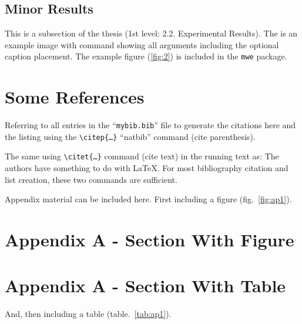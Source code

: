 \documentclass[ms-thesis,12pt,mathdesign]{ndsu-thesis-2022}
\begin{document}
\subsection{Minor Results}
This is a subsection of the thesis (1st level: 2.2. Experimental Results). 	\kant[8]
The  is an example image with command showing all arguments including the optional 
caption placement. The example figure (\cref{fig:2}) is included in the \texttt{mwe} package.

\kant[8]

\section{Some References}
Referring to all entries in the ``\texttt{mybib.bib}'' file to generate the citations here
and the listing using the \texttt{\textbackslash citep\{\ldots\}} ``natbib'' command
(cite parenthesis)\citep{texbook,lcompanion,latex2e,knuth1984,lesk1977,amsthm2017,
calvo2004using,cannayen2011latex,kopka2004guide,notso2021}.

The same using \texttt{\textbackslash citet\{\ldots\}} command (cite text) in the running
text as: The authors \citet{texbook,lcompanion,latex2e,knuth1984,lesk1977,amsthm2017,
calvo2004using,cannayen2011latex,kopka2004guide,notso2021} have something to do
with \LaTeX. For most bibliography citation and list creation, these two commands
are sufficient.


Appendix material can be included here. First including a figure (fig.~\ref{fig:ap1}).

\section{Appendix A - Section With Figure}
	\kant[8]

\section{Appendix A - Section With Table}
And, then including a table (table.~\ref{tab:ap1}).
\end{document}

